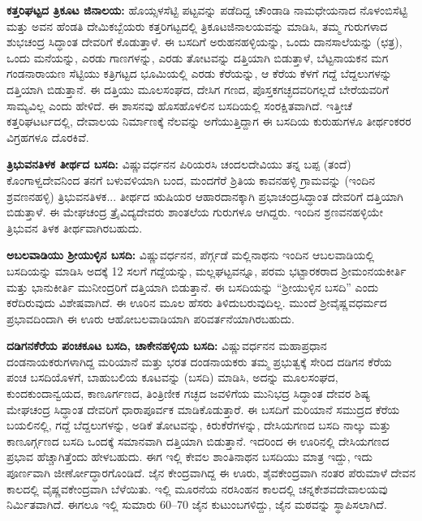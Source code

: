\textbf{ಕತ್ತರಿಘಟ್ಟದ ತ್ರಿಕೂಟ ಜಿನಾಲಯ:} ಹೊಯ್ಸಳಸೆಟ್ಟಿ ಪಟ್ಟವನ್ನು ಪಡೆದಿದ್ದ ಚೌಂಡಾಡಿ ನಾಮಧೇಯನಾದ ನೊಳಂಬಿಸೆಟ್ಟಿ ಮತ್ತು ಅವನ ಹೆಂಡತಿ ದೇಮಿಕಬ್ಬೆಯರು ಕತ್ತರಿಗಟ್ಟದಲ್ಲಿ ತ್ರಿಕೂಟಜಿನಾಲಯವನ್ನು ಮಾಡಿಸಿ, ತಮ್ಮ ಗುರುಗಳಾದ ಶುಭಚಂದ್ರ ಸಿದ್ಧಾಂತ ದೇವರಿಗೆ ಕೊಡುತ್ತಾಳೆ. ಈ ಬಸದಿಗೆ ಅರುಹನಹಳ್ಳಿಯನ್ನು, ಒಂದು ದಾನಸಾಲೆಯನ್ನು (ಛತ್ರ), ಒಂದು ಮನೆಯನ್ನು, ಎರಡು ಗಾಣಗಳನ್ನು, ಎರಡು ತೋಟವನ್ನು ದತ್ತಿಯಾಗಿ ಬಿಡುತ್ತಾಳೆ, ಬೆಟ್ಟನಾಯಕನ ಮಗ ಗಂಡನಾರಾಯಣ ಸೆಟ್ಟಿಯು ಕತ್ರಿಗಟ್ಟದ ಭೂಮಿಯಲ್ಲಿ ಎರಡು ಕೆರೆಯನ್ನು, ಆ ಕೆರೆಯ ಕೆಳಗೆ ಗದ್ದೆ ಬೆದ್ದಲುಗಳನ್ನು ದತ್ತಿಯಾಗಿ ಬಿಡುತ್ತಾನೆ. ಈ ದತ್ತಿಯು ಮೂಲಸಂಘದ, ದೇಸಿಗ ಗಣದ, ಪೊಸ್ತಕಗಚ್ಛದವರಿಗಲ್ಲದೆ ಬೇರೆಯವರಿಗೆ ಸಾಮ್ಯವಿಲ್ಲ ಎಂದು ಹೇಳಿದೆ. ಈ ಶಾಸನವು ಹೊಸಹೊಳಲಿನ ಬಸದಿಯಲ್ಲಿ ಸಂರಕ್ಷಿತವಾಗಿದೆ. ಇತ್ತೀಚೆ ಕತ್ತರಿಘಟರ್ಟದಲ್ಲಿ, ದೇವಾಲಯ ನಿರ್ಮಾಣಕ್ಕೆ ನೆಲವನ್ನು ಅಗೆಯುತ್ತಿದ್ದಾಗ ಈ ಬಸದಿಯ ಕುರುಹುಗಳೂ ತೀರ್ಥಂಕರರ ವಿಗ್ರಹಗಳೂ ದೊರಕಿವೆ.

\textbf{ತ್ರಿಭುವನತಿಳಕ ತೀರ್ಥದ ಬಸದಿ:} ವಿಷ್ಣುವರ್ಧನನ ಪಿರಿಯರಸಿ ಚಂದಲದೇವಿಯು ತನ್ನ ಬಪ್ಪ (ತಂದೆ) ಕೊಂಗಾಳ್ವದೇವನಿಂದ ತನಗೆ ಬಳುವಳಿಯಾಗಿ ಬಂದ, ಮಂದಗೆರೆ ಶ್ರಿತಿಯ ಕಾವನಹಳ್ಳಿ ಗ್ರಾಮವನ್ನು (ಇಂದಿನ ಶ್ರವಣನಹಳ್ಳಿ) ತ್ರಿಭುವನತಿಳಕ... ತೀರ್ಥದ ಋಷಿಯರ ಆಹಾರದಾನಕ್ಕಾಗಿ ಪ್ರಭಾಚಂದ್ರಸಿದ್ಧಾಂತ ದೇವರಿಗೆ ದತ್ತಿಯಾಗಿ ಬಿಡುತ್ತಾಳೆ. ಈ ಮೇಘಚಂದ್ರ ತ್ರೈವಿದ್ಯದೇವರು ಶಾಂತಲೆಯ ಗುರುಗಳೂ ಆಗಿದ್ದರು. ಇಂದಿನ ಶ್ರಣವನಹಳ್ಳಿಯೇ ತ್ರಿಭುವನ ತಿಳಕ ತೀರ್ಥವಾಗಿರಬಹುದು.

\textbf{ಅಬಲವಾಡಿಯು ಶ‍್ರೀಯುಳ್ಳಿನ ಬಸದಿ:} ವಿಷ್ಣುವರ್ಧನನ, ಪೆರ್ಗ್ಗಡೆ ಮಲ್ಲಿನಾಥನು ಇಂದಿನ ಆಬಲವಾಡಿಯಲ್ಲಿ ಬಸದಿಯನ್ನು ಮಾಡಿಸಿ ಅದಕ್ಕೆ 12 ಸಲಗೆ ಗದ್ದೆಯನ್ನು, ಮಲ್ಲಘಟ್ಟವನ್ನೂ, ಪರಮ ಭಟ್ಟಾರಕರಾದ ಶ‍್ರೀಮಂನಯಕೀರ್ತಿ ಮತ್ತು ಭಾನುಕೀರ್ತಿ ಮುನೀಂದ್ರರಿಗೆ ದತ್ತಿಯಾಗಿ ಬಿಡುತ್ತಾನೆ. ಈ ಬಸದಿಯನ್ನು “ಶ‍್ರೀಯುಳ್ಳಿನ ಬಸದಿ” ಎಂದು ಕರೆದಿರುವುದು ವಿಶೇಷವಾಗಿದೆ. ಈ ಊರಿನ ಮೂಲ ಹೆಸರು ತಿಳಿದುಬರುವುದಿಲ್ಲ. ಮುಂದೆ ಶ‍್ರೀವೈಷ್ಣವಧರ್ಮದ ಪ್ರಭಾವದಿಂದಾಗಿ ಈ ಊರು ಆಹೋಬಲವಾಡಿಯಾಗಿ ಪರಿವರ್ತನೆಯಾಗಿರಬಹುದು.

\textbf{ದಡಿಗನಕೆರೆಯ ಪಂಚಕೂಟ ಬಸದಿ, ಚಾಕೇನಹಳ್ಳಿಯ ಬಸದಿ:} ವಿಷ್ಣುವರ್ಧನನ ಮಹಾಪ್ರಧಾನ ದಂಡನಾಯಕರುಗಳಾಗಿದ್ದ ಮರಿಯಾನೆ ಮತ್ತು ಭರತ ದಂಡನಾಯಕರು ತಮ್ಮ ಪ್ರಭುತ್ವಕ್ಕೆ ಸೇರಿದ ದಡಿಗನ ಕೆರೆಯ ಪಂಚ ಬಸದಿಯೊಳಗೆ, ಬಾಹುಬಲಿಯ ಕೂಟವನ್ನು (ಬಸದಿ) ಮಾಡಿಸಿ, ಅದನ್ನು ಮೂಲಸಂಘದ, ಕುಂದಕುಂದಾನ್ವಯದ, ಕಾಣೂರ್ಗಣದ, ತಿಂತ್ರಿಣೀಕ ಗಚ್ಛದ ಜವಳಿಗೆಯ ಮುನಿಭದ್ರ ಸಿದ್ಧಾಂತ ದೇವರ ಶಿಷ್ಯ ಮೇಘಚಂದ್ರ ಸಿದ್ಧಾಂತ ದೇವರಿಗೆ ಧಾರಾಪೂರ್ವಕ ಮಾಡಿಕೊಡುತ್ತಾರೆ. ಈ ಬಸದಿಗೆ ಮರಿಯಾನೆ ಸಮುದ್ರದ ಕೆರೆಯ ಬಯಲಿನಲ್ಲಿ, ಗದ್ದೆ ಬೆದ್ದಲುಗಳನ್ನು, ಅಡಿಕೆ ತೋಟವನ್ನು, ಕಿರುಕೆರೆಗಳನ್ನು, ದೇಸಿಯಗಣದ ಬಸದಿ ನಾಲ್ಕು ಮತ್ತು ಕಾಣೂರ್ಗ್ಗಣದ ಬಸದಿ ಒಂದಕ್ಕೆ ಸಮಾನವಾಗಿ ದತ್ತಿಯಾಗಿ ಬಿಡುತ್ತಾನೆ. ಇದರಿಂದ ಈ ಊರಿನಲ್ಲಿ ದೇಸಿಯಗಣದ ಪ್ರಭಾವ ಹೆಚ್ಚಾಗಿತ್ತೆಂದು ಹೇಳಬಹುದು. ಈಗ ಇಲ್ಲಿ ಕೇವಲ ಶಾಂತಿನಾಥನ ಬಸದಿಯು ಮಾತ್ರ ಇದ್ದು, ಇದು ಪೂರ್ಣವಾಗಿ ಜೀರ್ಣೋದ್ಧಾರಗೊಂಡಿದೆ. ಜೈನ ಕೇಂದ್ರವಾಗಿದ್ದ ಈ ಊರು, ಶೈವಕೇಂದ್ರವಾಗಿ ನಂತರ ಪೆರುಮಾಳೆ ದೇವನ ಕಾಲದಲ್ಲಿ ವೈಷ್ಣವಕೇಂದ್ರವಾಗಿ ಬೆಳೆಯಿತು. ಇಲ್ಲಿ ಮೂರನೆಯ ನರಸಿಂಹನ ಕಾಲದಲ್ಲಿ ಚನ್ನಕೇಶವದೇವಾಲಯವು ನಿರ್ಮಿತವಾಗಿದೆ. ಈಗಲೂ ಇಲ್ಲಿ ಸುಮಾರು 60–70 ಜೈನ ಕುಟುಂಬಗಳಿದ್ದು, ಜೈನ ಮಠವನ್ನು ಸ್ಥಾಪಿಸಲಾಗಿದೆ. 

